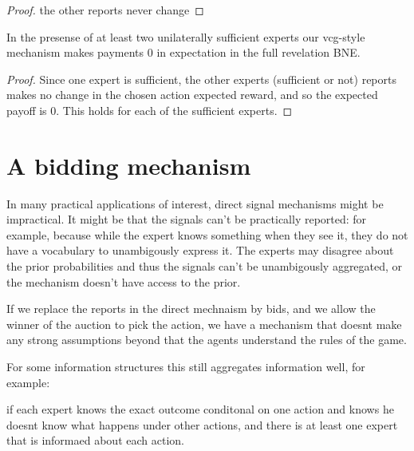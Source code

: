 \begin{proof}
    the other reports never change 
\end{proof}


\begin{lem}
	In the presense of at least two unilaterally sufficient experts our vcg-style mechanism makes payments 0 in expectation in the full revelation BNE. 
\end{lem}

\begin{proof}
    Since one expert is sufficient, the other experts (sufficient or not) reports makes no change in the chosen action expected reward, and so the expected payoff is 0. This holds for each of the sufficient experts.
\end{proof}










\section{A bidding mechanism}

In many practical applications of interest, direct signal mechanisms might be impractical. It might be that the signals can't be practically reported: for example, because while the expert knows something when they see it, they do not have a vocabulary to unambigously express it. The experts may disagree about the prior probabilities and thus the signals can't be unambigously aggregated, or the mechanism doesn't have access to the prior.

If we replace the reports in the direct mechnaism by bids, and we allow the winner of the auction to pick the action, we have a mechanism that doesnt make any strong assumptions beyond that the agents understand the rules of the game.

For some information structures this still aggregates information well, for example:

\begin{lem}
	if each expert knows the exact outcome conditonal on one action and knows he doesnt know what happens under other actions, and there is at least one expert that is informaed about each action.
\end{lem}

